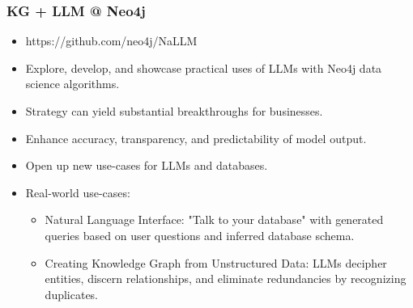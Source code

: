 

\begin{frame}[fragile]\frametitle{KG + LLM @ Neo4j}
\begin{itemize}
\item https://github.com/neo4j/NaLLM
\item Explore, develop, and showcase practical uses of LLMs with Neo4j data science algorithms.
\item Strategy can yield substantial breakthroughs for businesses.
\item Enhance accuracy, transparency, and predictability of model output.
\item Open up new use-cases for LLMs and databases.
\item Real-world use-cases:

	\begin{itemize}
	\item Natural Language Interface: "Talk to your database" with generated queries based on user questions and inferred database schema.
	\item Creating Knowledge Graph from Unstructured Data: LLMs decipher entities, discern relationships, and eliminate redundancies by recognizing duplicates.
	\end{itemize}

\end{itemize}
\end{frame}

